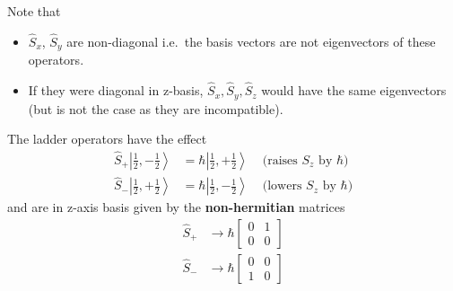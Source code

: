 Note that
\begin{itemize}
    \item $\widehat{S}_{x}$, $\widehat{S}_{y}$ are non-diagonal i.e.\ the basis vectors are not eigenvectors of these operators.
    \item If they were diagonal in z-basis, $\widehat{S}_{x},\widehat{S}_{y},\widehat{S}_{z}$ would have the same eigenvectors (but is not the case as they are incompatible).
\end{itemize}

\newpar{}

The ladder operators have the effect
\begin{align*}
    \widehat{S}_{+}\left|\frac{1}{2},-\frac{1}{2}\right> & =\hbar\left|\frac{1}{2},+\frac{1}{2}\right> & \text{ (raises $S_z$ by $\hbar$)} \\
    \widehat{S}_{-}\left|\frac{1}{2},+\frac{1}{2}\right> & =\hbar\left|\frac{1}{2},-\frac{1}{2}\right> & \text{ (lowers $S_z$ by $\hbar$)}
\end{align*}
and are in z-axis basis given by the \textbf{non-hermitian} matrices
\begin{align*}
    \widehat{S}_{+} & \rightarrow \hbar\begin{bmatrix}
                                           0 & 1 \\
                                           0 & 0
                                       \end{bmatrix} \\
    \widehat{S}_{-} & \rightarrow \hbar\begin{bmatrix}
                                           0 & 0 \\
                                           1 & 0
                                       \end{bmatrix}
\end{align*}
